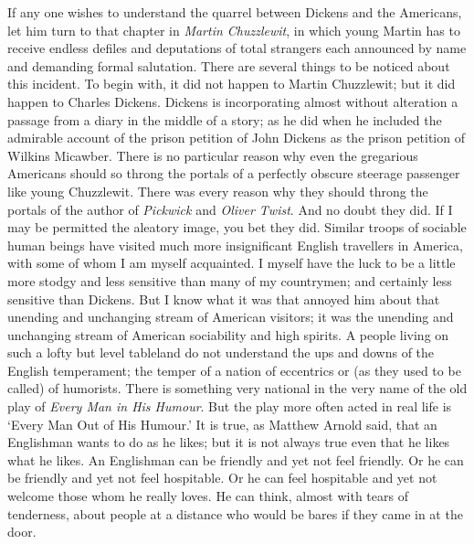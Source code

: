 \documentclass{book}
\begin{document}
If any one wishes to understand the quarrel between Dickens and the Americans, let him turn to that chapter in \emph{Martin Chuzzlewit}, in which young Martin has to receive endless defiles and deputations of total strangers each announced by name and demanding formal salutation. There are several things to be noticed about this incident. To begin with, it did not happen to Martin Chuzzlewit; but it did happen to Charles Dickens. Dickens is incorporating almost without alteration a passage from a diary in the middle of a story; as he did when he included the admirable account of the prison petition of John Dickens as the prison petition of Wilkins Micawber. There is no particular reason why even the gregarious Americans should so throng the portals of a perfectly obscure steerage passenger like young Chuzzlewit. There was every reason why they should throng the portals of the author of \emph{Pickwick} and \emph{Oliver Twist}. And no doubt they did. If I may be permitted the aleatory image, you bet they did. Similar troops of sociable human beings have visited much more insignificant English travellers in America, with some of whom I am myself acquainted. I myself have the luck to be a little more stodgy and less sensitive than many of my countrymen; and certainly less sensitive than Dickens. But I know what it was that annoyed him about that unending and unchanging stream of American visitors; it was the unending and unchanging stream of American sociability and high spirits. A people living on such a lofty but level tableland do not understand the ups and downs of the English temperament; the temper of a nation of eccentrics or (as they used to be called) of humorists. There is something very national in the very name of the old play of \emph{Every Man in His Humour}. But the play more often acted in real life is ‘Every Man Out of His Humour.’ It is true, as Matthew Arnold said, that an Englishman wants to do as he likes; but it is not always true even that he likes what he likes. An Englishman can be friendly and yet not feel friendly. Or he can be friendly and yet not feel hospitable. Or he can feel hospitable and yet not welcome those whom he really loves. He can think, almost with tears of tenderness, about people at a distance who would be bares if they came in at the door.
\end{document}
